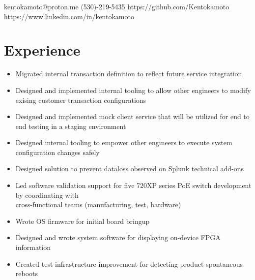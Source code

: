 \documentclass{Custom_CV}
\begin{document}
{kentokamoto@proton.me}
{}
{}
{(530)-219-5435}
{https://github.com/Kentokamoto}
{https://www.linkedin.com/in/kentokamoto}

\hfill %
\section{Experience}
\begin{itemize}[noitemsep]
    \item Migrated internal transaction definition to reflect future service integration
    \item Designed and implemented internal tooling to allow other engineers to modify exising customer transaction configurations
    \item Designed and implemented mock client service that will be utilized for end to end testing in a staging environment
    \item Designed internal tooling to empower other engineers to execute system configuration changes safely
\end{itemize}

\begin{itemize}[noitemsep]
    \item Designed solution to prevent dataloss observed on Splunk technical add-ons
\end{itemize}

\begin{itemize}[noitemsep]
    \item Led software validation support for five 720XP series PoE switch development by coordinating with\\ cross-functional teams (manufacturing, test, hardware)
    \item Wrote OS firmware for initial board bringup
    \item Designed and wrote system software for displaying on-device FPGA information
    \item Created test infrastructure improvement for detecting product spontaneous reboots
\end{itemize}
\end{document}
